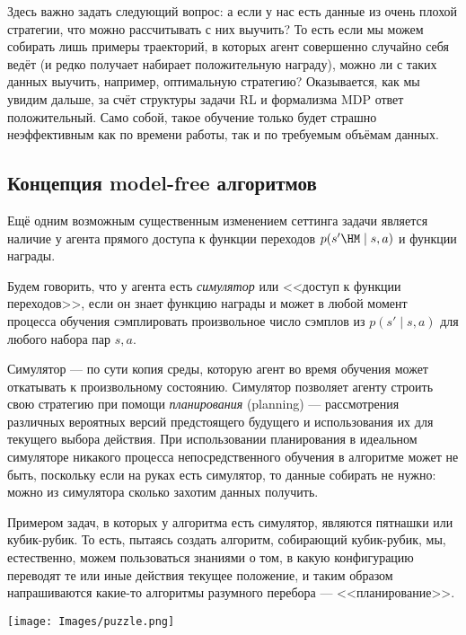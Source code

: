 Здесь важно задать следующий вопрос: а если у нас есть данные из очень плохой стратегии, что можно рассчитывать с них выучить? То есть если мы можем собирать лишь примеры траекторий, в которых агент совершенно случайно себя ведёт (и редко получает набирает положительную награду), можно ли с таких данных выучить, например, оптимальную стратегию? Оказывается, как мы увидим дальше, за счёт структуры задачи RL и формализма MDP ответ положительный. Само собой, такое обучение только будет страшно неэффективным как по времени работы, так и по требуемым объёмам данных.

\subsection{Концепция model-free алгоритмов}

Ещё одним возможным существенным изменением сеттинга задачи является наличие у агента прямого доступа к функции переходов $p(s' \HM\mid s, a)$ и функции награды.

\begin{definition}
Будем говорить, что у агента есть \emph{симулятор} или <<доступ к функции переходов>>, если он знает функцию награды и может в любой момент процесса обучения сэмплировать произвольное число сэмплов из $p(s' \mid s, a)$ для любого набора пар $s, a$.
\end{definition}

Симулятор --- по сути копия среды, которую агент во время обучения может откатывать к произвольному состоянию. Симулятор позволяет агенту строить свою стратегию при помощи \emph{планирования} (planning) --- рассмотрения различных вероятных версий предстоящего будущего и использования их для текущего выбора действия. При использовании планирования в идеальном симуляторе никакого процесса непосредственного обучения в алгоритме может не быть, поскольку если на руках есть симулятор, то данные собирать не нужно: можно из симулятора сколько захотим данных получить.

\begin{exampleBox}[righthand ratio=0.15, sidebyside, sidebyside align=center, lower separated=false]{}
Примером задач, в которых у алгоритма есть симулятор, являются пятнашки или кубик-рубик. То есть, пытаясь создать алгоритм, собирающий кубик-рубик, мы, естественно, можем пользоваться знаниями о том, в какую конфигурацию переводят те или иные действия текущее положение, и таким образом напрашиваются какие-то алгоритмы разумного перебора --- <<планирование>>.

\tcblower
\texttt{[image: Images/puzzle.png]}
\end{exampleBox}

